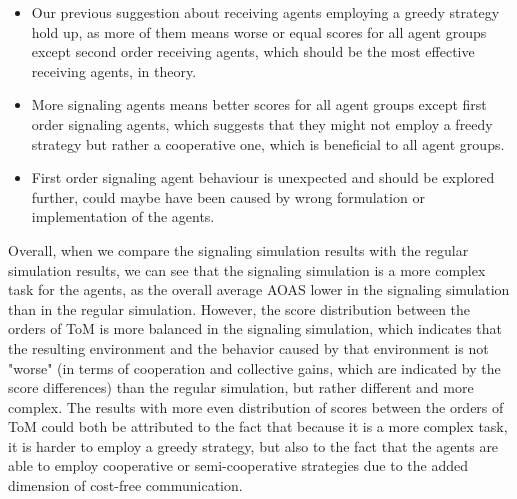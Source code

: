 \begin{itemize}
    \item Our previous suggestion about receiving agents employing a greedy strategy hold up, as more of them means worse or equal scores for all agent groups except second order receiving agents, which should be the most effective receiving agents, in theory.
    \item More signaling agents means better scores for all agent groups except first order signaling agents, which suggests that they might not employ a freedy strategy but rather a cooperative one, which is beneficial to all agent groups.
    \item First order signaling agent behaviour is unexpected and should be explored further, could maybe have been caused by wrong formulation or implementation of the agents.
\end{itemize}

Overall, when we compare the signaling simulation results with the regular simulation results, we can see that the signaling simulation is a more complex task for the agents, as the overall average AOAS lower in the signaling simulation than in the regular simulation. However, the score distribution between the orders of ToM is more balanced in the signaling simulation, which indicates that the resulting environment and the behavior caused by that environment is not "worse" (in terms of cooperation and collective gains, which are indicated by the score differences) than the regular simulation, but rather different and more complex. The results with more even distribution of scores between the orders of ToM could both be attributed to the fact that because it is a more complex task, it is harder to employ a greedy strategy, but also to the fact that the agents are able to employ cooperative or semi-cooperative strategies due to the added dimension of cost-free communication. 